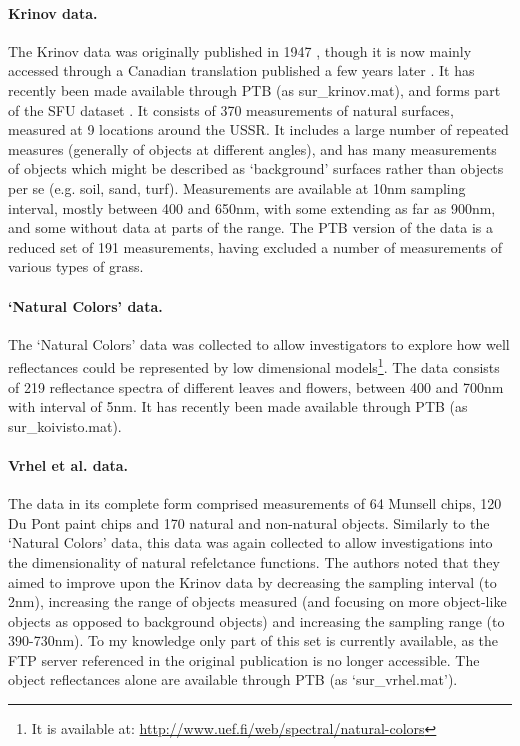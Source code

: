 \paragraph{Krinov data.}
The Krinov data was originally published in 1947 \citep{krinov_spektralnaya_1947}, though it is now mainly accessed through a Canadian translation published a few years later \cite{krinov_spectral_1953}. It has recently been made available through \gls{PTB} \cite{brainard_psychophysics_1997} (as sur\_krinov.mat), and forms part of the SFU dataset \cite{barnard_data_2002}. It consists of 370 measurements of natural surfaces, measured at 9 locations around the USSR. It includes a large number of repeated measures (generally of objects at different angles), and has many measurements of objects which might be described as `background' surfaces rather than objects per se (e.g. soil, sand, turf). Measurements are available at 10nm sampling interval, mostly between 400 and 650nm, with some extending as far as 900nm, and some without data at parts of the range. The \gls{PTB} version of the data is a reduced set of 191 measurements, having excluded a number of measurements of various types of grass. 

\paragraph{`Natural Colors' data.}
The `Natural Colors' data \citep{parkkinen_spectral_1988} was collected to allow investigators to explore how well reflectances could be represented by low dimensional models\footnote{It is available at: \url{http://www.uef.fi/web/spectral/natural-colors}}. The data consists of 219 reflectance spectra of different leaves and flowers, between 400 and 700nm with interval of 5nm. It has recently been made available through \gls{PTB} (as sur\_koivisto.mat).

\paragraph{Vrhel et al. data.}
The \citet{vrhel_measurement_1994} data in its complete form comprised measurements of 64 Munsell chips, 120 Du Pont paint chips and 170 natural and non-natural objects. Similarly to the `Natural Colors' data, this data was again collected to allow investigations into the dimensionality of natural refelctance functions. The authors noted that they aimed to improve upon the Krinov data by decreasing the sampling interval (to 2nm), increasing the range of objects measured (and focusing on more object-like objects as opposed to background objects) and increasing the sampling range (to 390-730nm). To my knowledge only part of this set is currently available, as the FTP server referenced in the original publication is no longer accessible. The object reflectances alone are available through \gls{PTB} (as `sur\_vrhel.mat').

